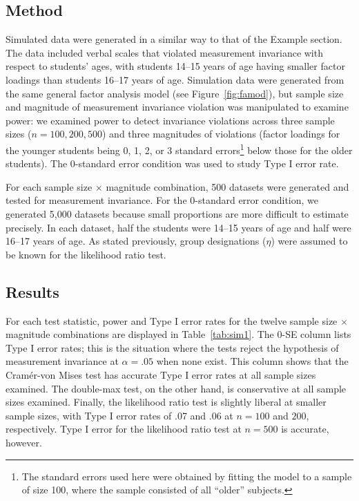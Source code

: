 \documentclass[man]{apa}
\begin{document}
\subsection{Method}
Simulated data were generated in a similar way to that of 
the Example section.
The data included verbal scales that violated measurement invariance
with respect to students' ages, with students 14--15 years of age
having smaller factor loadings than students 16--17 years of age.  
Simulation data were generated from the same general factor analysis
model (see Figure~\ref{fig:famod}), but sample size and magnitude
of measurement 
invariance violation was manipulated to examine power:
we examined power to detect 
invariance violations across three sample sizes ($n=100,
200, 500$) and three magnitudes of violations (factor loadings
for the younger students being 0, 1, 2, or 3 standard
errors\footnote{The standard errors used here were
  obtained by fitting
  the model to a sample of size 100, where the sample consisted of all
  ``older'' subjects.} below 
those for the older students).  The 0-standard error condition was
used to study Type I error rate.

For each sample size $\times$
magnitude combination, 500 datasets were generated and tested for
measurement invariance.  For the 0-standard error condition, we
generated 5,000 datasets because small proportions are more
 difficult to estimate precisely.  In each dataset, half the
students were 14--15 
years of age and half were 16--17 years of age.  As stated previously,
group
designations ($\eta$) were assumed to be
known for the likelihood ratio test.

\subsection{Results}
For each test statistic, power and Type I error rates for the twelve
sample size $\times$ magnitude combinations are displayed in
Table~\ref{tab:sim1}.  The 0-SE column lists Type I error rates; this
is the situation where the tests reject the hypothesis of measurement
invariance at $\alpha=.05$ when none exist.  This column 
shows that the Cram\'{e}r-von Mises test has accurate Type I error
rates at all sample sizes examined.
The double-max test, on the other hand, is conservative at
all sample sizes examined.  Finally, the likelihood ratio test is
slightly liberal at smaller sample sizes, with Type I error rates of
.07 and .06 at $n=100$ and $200$, respectively.  Type I error for the
likelihood ratio test at $n=500$ is accurate, however.
\end{document}
